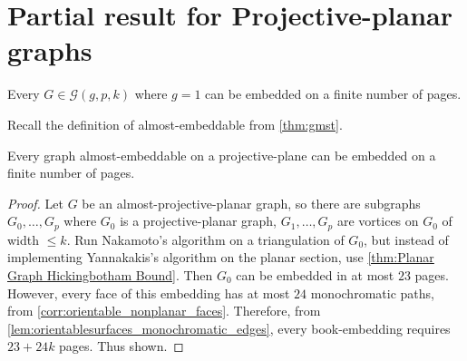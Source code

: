 
\section{Partial result for Projective-planar graphs}

\begin{theorem}
	Every $G \in \mathcal{G}(g, p, k)$ where $g = 1$ can be embedded on a finite number of pages.
\end{theorem}
Recall the definition of almost-embeddable from \cref{thm:gmst}. 
\begin{theorem}
	Every graph almost-embeddable on a projective-plane can be embedded on a finite number of pages. 
\end{theorem}

\begin{proof}
	Let $G$ be an almost-projective-planar graph, so there are subgraphs $G_0, \ldots, G_p$ where $G_0$ is a projective-planar graph, $G_1, \ldots, G_p$ are vortices on $G_0$ of width $\leq k$. 
	Run Nakamoto's algorithm on a triangulation of $G_0$, but instead of implementing Yannakakis's algorithm on the planar section, use \cref{thm:Planar Graph Hickingbotham Bound}. Then $G_0$ can be embedded in at most $23$ pages. However, every face of this embedding has at most $24$ monochromatic paths, from \cref{corr:orientable_nonplanar_faces}. Therefore, from \cref{lem:orientablesurfaces_monochromatic_edges}, every book-embedding requires $23 + 24k$ pages. Thus shown. 
\end{proof}